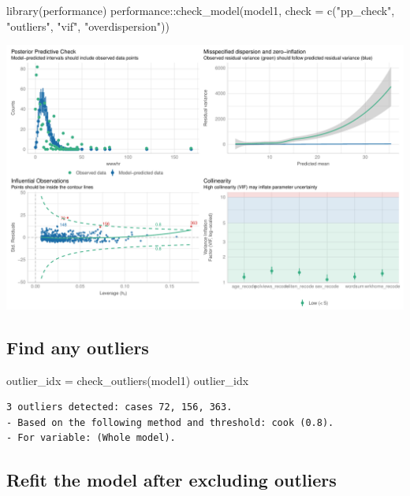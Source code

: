 \documentclass[
  letterpaper,
  DIV=11,
  numbers=noendperiod]{scrartcl}
\newenvironment{Shaded}{\begin{snugshade}}{\end{snugshade}}
\newcommand{\AttributeTok}[1]{\textcolor[rgb]{0.40,0.45,0.13}{#1}}
\newcommand{\FunctionTok}[1]{\textcolor[rgb]{0.28,0.35,0.67}{#1}}
\newcommand{\NormalTok}[1]{\textcolor[rgb]{0.00,0.23,0.31}{#1}}
\newcommand{\OtherTok}[1]{\textcolor[rgb]{0.00,0.23,0.31}{#1}}
\newcommand{\SpecialCharTok}[1]{\textcolor[rgb]{0.37,0.37,0.37}{#1}}
\newcommand{\StringTok}[1]{\textcolor[rgb]{0.13,0.47,0.30}{#1}}
\begin{document}
\begin{Shaded}
\begin{Highlighting}[]
\FunctionTok{library}\NormalTok{(performance)}
\NormalTok{performance}\SpecialCharTok{::}\FunctionTok{check\_model}\NormalTok{(model1, }\AttributeTok{check =} \FunctionTok{c}\NormalTok{(}\StringTok{"pp\_check"}\NormalTok{, }\StringTok{"outliers"}\NormalTok{, }\StringTok{"vif"}\NormalTok{, }\StringTok{"overdispersion"}\NormalTok{))}
\end{Highlighting}
\end{Shaded}

\includegraphics{poisson_lab_questions-1_files/figure-pdf/unnamed-chunk-7-1.pdf}

\subsection{Find any outliers}\label{find-any-outliers}

\begin{Shaded}
\begin{Highlighting}[]
\NormalTok{outlier\_idx }\OtherTok{=} \FunctionTok{check\_outliers}\NormalTok{(model1)}
\NormalTok{outlier\_idx}
\end{Highlighting}
\end{Shaded}

\begin{verbatim}
3 outliers detected: cases 72, 156, 363.
- Based on the following method and threshold: cook (0.8).
- For variable: (Whole model).
\end{verbatim}

\subsection{Refit the model after excluding
outliers}\label{refit-the-model-after-excluding-outliers}
\end{document}
